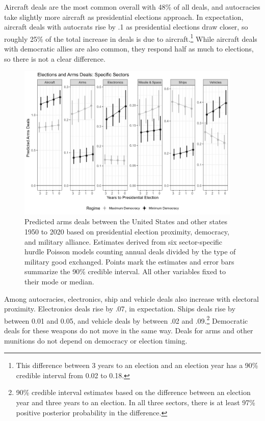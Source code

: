 \documentclass[12pt]{article}
\begin{document}
Aircraft deals are the most common overall with 48\% of all deals, and autocracies take slightly more aircraft as presidential elections approach.
In expectation, aircraft deals with autocrats rise by .1 as presidential elections draw closer, so roughly 25\% of the total increase in deals is due to aircraft.\footnote{This difference between 3 years to an election and an election year has a 90\% credible interval from 0.02 to 0.18.}
While aircraft deals with democratic allies are also common, they respond half as much to elections, so there is not a clear difference.  



\begin{figure}[htpb]
	\centering
		\includegraphics[width=0.95\textwidth]{../figures/deals-sector.png}
	\caption{Predicted arms deals between the United States and other states 1950 to 2020 based on presidential election proximity, democracy, and military alliance. Estimates derived from six sector-specific hurdle Poisson models counting annual deals divided by the type of military good exchanged. Points mark the estimates and error bars summarize the 90\% credible interval. All other variables fixed to their mode or median.}
	\label{fig:deals-sector}
\end{figure}


Among autocracies, electronics, ship and vehicle deals also increase with electoral proximity. 
Electronics deals rise by .07, in expectation.
Ships deals rise by between 0.01 and 0.05, and vehicle deals by between .02 and .09.\footnote{90\% credible interval estimates based on the difference between an election year and three years to an election. In all three sectors, there is at least 97\% positive posterior probability in the difference.}
Democratic deals for these weapons do not move in the same way.
Deals for arms and other munitions do not depend on democracy or election timing. 
\end{document}
